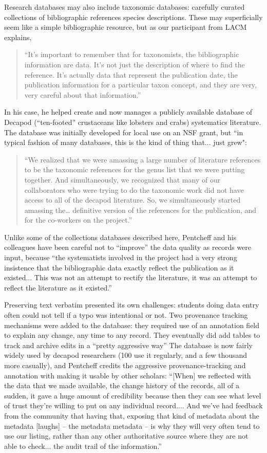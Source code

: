 Research databases may also include taxonomic databases: carefully curated collections of bibliographic references species descriptions. These may superficially seem like a simple bibliographic resource, but as our participant from LACM explains,
\begin{quote}
“It’s important to remember that for taxonomists, the bibliographic information are data. It's not just the description of where to find the reference. It's actually data that represent the publication date, the publication information for a particular taxon concept, and they are very, very careful about that information.”
\end{quote}
In his case, he helped create and now manages a publicly available database of Decapod (“ten-footed” crustaceans like lobsters and crabs) systematics literature. The database was initially developed for local use on an NSF grant, but “in typical fashion of many databases, this is the kind of thing that... just grew":
\begin{quote}
“We realized that we were amassing a large number of literature references to be the taxonomic references for the genus list that we were putting together. And simultaneously, we recognized that many of our collaborators who were trying to do the taxonomic work did not have access to all of the decapod literature. So, we simultaneously started amassing the… definitive version of the references for the publication, and for the co-workers on the project.”
\end{quote}
Unlike some of the collections databases described here, Pentcheff and his colleagues have been careful not to “improve” the data quality as records were input, because “the systematists involved in the project had a very strong insistence that the bibliographic data exactly reflect the publication as it existed... This was not an attempt to rectify the literature, it was an attempt to reflect the literature as it existed.” 

Preserving text verbatim presented its own challenges: students doing data entry often could not tell if a typo was intentional or not. Two provenance tracking mechanisms were added to the database:
they required use of an annotation field to explain any change, any time to any record.
They eventually did add tables to track and archive edits in a “pretty aggressive way”
The database is now fairly widely used by decapod researchers (100 use it regularly, and a few thousand more casually), and Pentcheff credits the aggressive provenance-tracking and annotation with making it usable by other scholars:
“[When] we reflected with the data that we made available, the change history of the records, all of a sudden, it gave a huge amount of credibility because then they can see what level of trust they're willing to put on any individual record.... And we've had feedback from the community that having that, exposing that kind of metadata about the metadata [laughs] – the metadata metadata – is why they will very often tend to use our listing, rather than any other authoritative source where they are not able to check... the audit trail of the information.”



